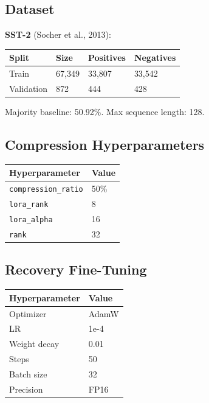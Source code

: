 \subsection{Dataset}

\textbf{SST-2} (Socher et al., 2013):

\begin{table}[H]
\centering
\small
\begin{tabular}{llll}
\toprule
\textbf{Split} & \textbf{Size} & \textbf{Positives} & \textbf{Negatives} \\
\midrule
Train & 67,349 & 33,807 & 33,542 \\
Validation & 872 & 444 & 428 \\
\bottomrule
\end{tabular}
\end{table}

Majority baseline: 50.92\%. Max sequence length: 128.

\subsection{Compression Hyperparameters}

\begin{table}[H]
\centering
\small
\begin{tabular}{ll}
\toprule
\textbf{Hyperparameter} & \textbf{Value} \\
\midrule
\texttt{compression\_ratio} & 50\% \\
\texttt{lora\_rank} & 8 \\
\texttt{lora\_alpha} & 16 \\
\texttt{rank} & 32 \\
\bottomrule
\end{tabular}
\end{table}

\subsection{Recovery Fine-Tuning}

\begin{table}[H]
\centering
\small
\begin{tabular}{ll}
\toprule
\textbf{Hyperparameter} & \textbf{Value} \\
\midrule
Optimizer & AdamW \\
LR & 1e-4 \\
Weight decay & 0.01 \\
Steps & 50 \\
Batch size & 32 \\
Precision & FP16 \\
\bottomrule
\end{tabular}
\end{table}

